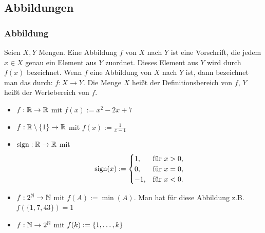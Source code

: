 \subsection{Abbildungen}

\subsubsection{Abbildung}

Seien $ X,Y $ Mengen. Eine Abbildung $ f $ von $ X $ nach $ Y $ ist eine Vorschrift, die jedem $ x \in X $ genau ein Element aus $ Y $ zuordnet. Dieses Element aus $ Y $ wird durch $ f(x) $ bezeichnet.
Wenn $ f $ eine Abbildung von $ X $ nach $ Y $ ist, dann bezeichnet man das durch: $ f : X \to Y $. Die Menge $ X $ heißt der Definitionsbereich von $ f $, $ Y $ heißt der Wertebereich von $ f $.

%

\begin{itemize}
	\item $ f : \mathbb R \to \mathbb R$ mit $ f(x) := x^2 -2x + 7 $
	\item $ f : \mathbb R \setminus \{ 1 \} \to \mathbb R$ mit $f(x) := \frac{1}{x-1}$
	\item $ \operatorname{sign}: \mathbb R \to \mathbb R $ mit 
	\[
	 \sign(x) := \begin{cases} 1,  & \text{für} \ x>0, \\
	 0,  &\text{für} \ x=0, 
 \\ -1, & \text{für} \ x<0. \end{cases} 
	\]
	\item $ f : 2^{\mathbb N} \to \mathbb N$ mit $ f(A) := \min(A)$. Man hat für diese Abbildung  z.B. $ f( \{ 1,7,43 \} ) = 1 $
	\item $ f : \mathbb N \to 2^\mathbb N$ mit  $f(k) := \{ 1,\ldots,k \}$
\end{itemize}

